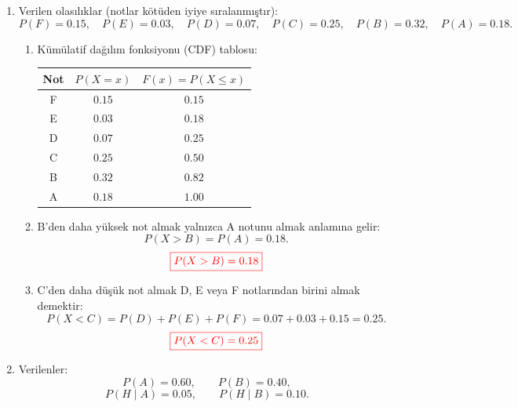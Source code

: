 \documentclass[12pt,a4paper]{article}
\begin{document}
\begin{enumerate}
\begin{enumerate}
\item $10$ oyun için beklenen toplam kazanç:
\[
10\cdot E(X)=10\cdot\frac{1}{3}=\frac{10}{3}\ \text{TL}.
\]
Başlangıç ücreti ($30$~TL) düşüldüğünde net beklenen değer:
\[
\frac{10}{3}-30=\frac{10-90}{3}=-\frac{80}{3}\ \text{TL}\approx -26{,}67\ \text{TL}.
\]
\[
{\color{red}\boxed{\text{Net beklenen kazanç}=-\frac{80}{3}\ \text{TL}\approx -26{,}67\ \text{TL}}}
\]
\end{enumerate}

\item Verilen olasılıklar (notlar kötüden iyiye sıralanmıştır):
\[
P(F)=0.15,\quad
P(E)=0.03,\quad
P(D)=0.07,\quad
P(C)=0.25,\quad
P(B)=0.32,\quad
P(A)=0.18.
\]

\begin{enumerate}
\item Kümülatif dağılım fonksiyonu (CDF) tablosu:

\begin{center}
\begin{tabular}{ccc}
\toprule
\textbf{Not} & $P(X=x)$ & $F(x)=P(X\le x)$\\
\midrule
F & $0.15$ & $0.15$\\
E & $0.03$ & $0.18$\\
D & $0.07$ & $0.25$\\
C & $0.25$ & $0.50$\\
B & $0.32$ & $0.82$\\
A & $0.18$ & $1.00$\\
\bottomrule
\end{tabular}
\end{center}

\item B'den daha yüksek not almak yalnızca A notunu almak anlamına gelir:
\[
P(X>B)=P(A)=0.18.
\]
\[
{\color{red}\boxed{P(X>B)=0.18}}
\]

\item C'den daha düşük not almak D, E veya F notlarından birini almak demektir:
\[
P(X<C)=P(D)+P(E)+P(F)=0.07+0.03+0.15=0.25.
\]
\[
{\color{red}\boxed{P(X<C)=0.25}}
\]
\end{enumerate}

\item Verilenler:
\[
P(A)=0.60,\qquad P(B)=0.40,
\]
\[
P(H\mid A)=0.05,\qquad P(H\mid B)=0.10.
\]


\end{enumerate}
\end{document}
